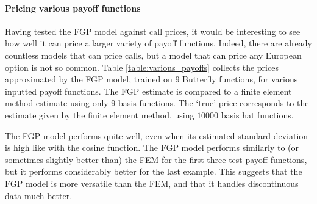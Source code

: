 \documentclass[a4paper,12pt]{article}
\begin{document}
\paragraph{Pricing various payoff functions}
Having tested the FGP model against call prices, it would be interesting to see how well it can price a larger variety of payoff functions. Indeed, there are already countless models that can price calls, but a model that can price any European option is not so common. Table \ref{table:various_payoffs} collects the prices approximated by the FGP model, trained on 9 Butterfly functions, for various inputted payoff functions. The FGP estimate is compared to a finite element method estimate using only 9 basis functions. The `true' price corresponds to the estimate given by the finite element method, using $ 10000 $ basis hat functions.
\begin{table}[H]
\begin{center}
\end{center}
\caption{FGP price approximation for various payoff inputs compared to a FEM price approximation and a `true' price.}
\label{table:various_payoffs}
\end{table}
\noindent The FGP model performs quite well, even when its estimated standard deviation is high like with the cosine function. The FGP model performs similarly to (or sometimes slightly better than) the FEM for the first three test payoff functions, but it performs considerably better for the last example. This suggests that the FGP model is more versatile than the FEM, and that it handles discontinuous data much better.
\end{document}
